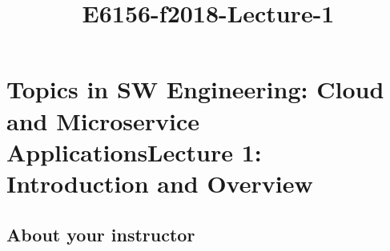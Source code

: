 \documentclass[11pt]{article}
\title{E6156-f2018-Lecture-1}
\begin{document}
    
    
    \maketitle
    
    

    
    \section{\texorpdfstring{Topics in SW Engineering: Cloud and
Microservice ApplicationsLecture 1: Introduction and
Overview}{Topics in SW Engineering: Cloud and Microservice Applications Lecture 1: Introduction and Overview}}\label{topics-in-sw-engineering-cloud-and-microservice-applications-lecture-1-introduction-and-overview}

    \subsection{About your instructor}\label{about-your-instructor}
\end{document}
